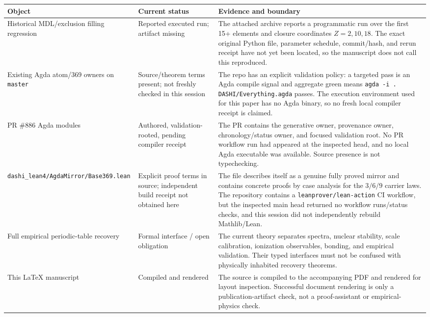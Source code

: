 \documentclass[11pt,a4paper]{article}
\theoremstyle{remark}
\begin{document}
\begin{longtable}{p{}p{}p{}}
\toprule
Object & Current status & Evidence and boundary\\
\midrule
Historical MDL/exclusion filling regression & Reported executed run; artifact missing & The attached archive reports a programmatic run over the first 15+ elements and closure coordinates $Z=2,10,18$.  The exact original Python file, parameter schedule, commit/hash, and rerun receipt have not yet been located, so the manuscript does not call this reproduced.\\
Existing Agda atom/369 owners on \texttt{master} & Source/theorem terms present; not freshly checked in this session & The repo has an explicit validation policy: a targeted pass is an Agda compile signal and aggregate green means \texttt{agda -i . DASHI/Everything.agda} passes.  The execution environment used for this paper has no Agda binary, so no fresh local compiler receipt is claimed.\\
PR \#886 Agda modules & Authored, validation-rooted, pending compiler receipt & The PR contains the generative owner, provenance owner, chronology/status owner, and focused validation root.  No PR workflow run had appeared at the inspected head, and no local Agda executable was available.  Source presence is not typechecking.\\
\texttt{dashi\_lean4/AgdaMirror/Base369.lean} & Explicit proof terms in source; independent build receipt not obtained here & The file describes itself as a genuine fully proved mirror and contains concrete proofs by case analysis for the $3/6/9$ carrier laws.  The repository contains a \texttt{leanprover/lean-action} CI workflow, but the inspected main head returned no workflow runs/status checks, and this session did not independently rebuild Mathlib/Lean.\\
Full empirical periodic-table recovery & Formal interface / open obligation & The current theory separates spectra, nuclear stability, scale calibration, ionization observables, bonding, and empirical validation.  Their typed interfaces must not be confused with physically inhabited recovery theorems.\\
This \LaTeX{} manuscript & Compiled and rendered & The source is compiled to the accompanying PDF and rendered for layout inspection.  Successful document rendering is only a publication-artifact check, not a proof-assistant or empirical-physics check.\\
\bottomrule
\end{longtable}
\end{document}
